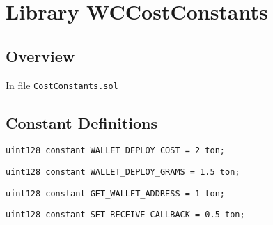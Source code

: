 
\chapter{Library WCCostConstants}

\minitoc

\section{Overview}


In file {\tt CostConstants.sol}

\section{Constant Definitions}


\begin{lstlisting}[firstnumber=4]
    uint128 constant WALLET_DEPLOY_COST = 2 ton;
\end{lstlisting}

\begin{lstlisting}[firstnumber=5]
    uint128 constant WALLET_DEPLOY_GRAMS = 1.5 ton;
\end{lstlisting}

\begin{lstlisting}[firstnumber=6]
    uint128 constant GET_WALLET_ADDRESS = 1 ton;
\end{lstlisting}

\begin{lstlisting}[firstnumber=7]
    uint128 constant SET_RECEIVE_CALLBACK = 0.5 ton;
\end{lstlisting}
